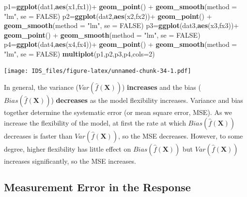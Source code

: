 \documentclass[12pt,]{krantz}
\newenvironment{Shaded}{\begin{snugshade}}{\end{snugshade}}
\newcommand{\KeywordTok}[1]{\textcolor[rgb]{0.13,0.29,0.53}{\textbf{{#1}}}}
\newcommand{\DataTypeTok}[1]{\textcolor[rgb]{0.13,0.29,0.53}{{#1}}}
\newcommand{\DecValTok}[1]{\textcolor[rgb]{0.00,0.00,0.81}{{#1}}}
\newcommand{\StringTok}[1]{\textcolor[rgb]{0.31,0.60,0.02}{{#1}}}
\newcommand{\OtherTok}[1]{\textcolor[rgb]{0.56,0.35,0.01}{{#1}}}
\newcommand{\NormalTok}[1]{{#1}}
\theoremstyle{definition}
\theoremstyle{definition}
\theoremstyle{remark}
\begin{document}
\begin{Shaded}
\begin{Highlighting}[]
\NormalTok{p1=}\KeywordTok{ggplot}\NormalTok{(dat1,}\KeywordTok{aes}\NormalTok{(x1,fx1))+}\StringTok{ }
\StringTok{  }\KeywordTok{geom_point}\NormalTok{() +}
\StringTok{  }\KeywordTok{geom_smooth}\NormalTok{(}\DataTypeTok{method =} \StringTok{"lm"}\NormalTok{, }\DataTypeTok{se =} \OtherTok{FALSE}\NormalTok{)}
\NormalTok{p2=}\KeywordTok{ggplot}\NormalTok{(dat2,}\KeywordTok{aes}\NormalTok{(x2,fx2))+}\StringTok{ }
\StringTok{  }\KeywordTok{geom_point}\NormalTok{() +}
\StringTok{  }\KeywordTok{geom_smooth}\NormalTok{(}\DataTypeTok{method =} \StringTok{"lm"}\NormalTok{, }\DataTypeTok{se =} \OtherTok{FALSE}\NormalTok{)}
\NormalTok{p3=}\KeywordTok{ggplot}\NormalTok{(dat3,}\KeywordTok{aes}\NormalTok{(x3,fx3))+}\StringTok{ }
\StringTok{  }\KeywordTok{geom_point}\NormalTok{() +}
\StringTok{  }\KeywordTok{geom_smooth}\NormalTok{(}\DataTypeTok{method =} \StringTok{"lm"}\NormalTok{, }\DataTypeTok{se =} \OtherTok{FALSE}\NormalTok{)}
\NormalTok{p4=}\KeywordTok{ggplot}\NormalTok{(dat4,}\KeywordTok{aes}\NormalTok{(x4,fx4))+}\StringTok{ }
\StringTok{  }\KeywordTok{geom_point}\NormalTok{() +}
\StringTok{  }\KeywordTok{geom_smooth}\NormalTok{(}\DataTypeTok{method =} \StringTok{"lm"}\NormalTok{, }\DataTypeTok{se =} \OtherTok{FALSE}\NormalTok{)}
\KeywordTok{multiplot}\NormalTok{(p1,p2,p3,p4,}\DataTypeTok{cols=}\DecValTok{2}\NormalTok{)}
\end{Highlighting}
\end{Shaded}

\texttt{[image: IDS\_files/figure-latex/unnamed-chunk-34-1.pdf]}

In general, the variance (\(Var(\hat{f}(\mathbf{X}))\))
\textbf{increases} and the bias (\(Bias(\hat{f}(\mathbf{X}))\))
\textbf{decreases} as the model flexibility increases. Variance and bias
together determine the systematic error (or mean square error, MSE). As
we increase the flexibility of the model, at first the rate at which
\(Bias(\hat{f}(\mathbf{X}))\) decreases is faster than
\(Var (\hat{f} (\mathbf{X}))\), so the MSE decreases. However, to some
degree, higher flexibility has little effect on
\(Bias(\hat{f}(\mathbf{X}))\) but \(Var(\hat{f} (\mathbf{X}))\)
increases significantly, so the MSE increases.

\subsection{Measurement Error in the
Response}\label{measurement-error-in-the-response}
\end{document}
